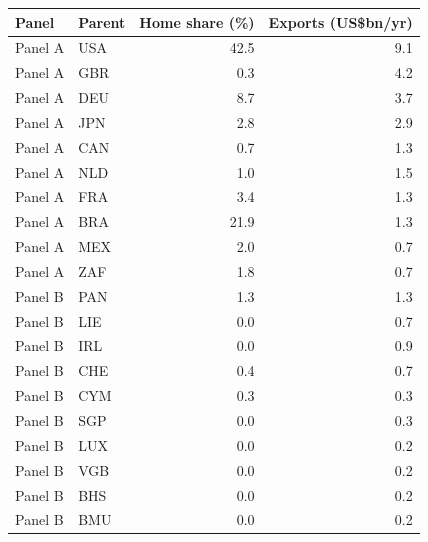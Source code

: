 \begin{tabular}{llrr}
\toprule
Panel & Parent & Home share (\%) & Exports (US\$bn/yr) \\
\midrule
Panel A & USA & 42.5 & 9.1 \\
Panel A & GBR & 0.3 & 4.2 \\
Panel A & DEU & 8.7 & 3.7 \\
Panel A & JPN & 2.8 & 2.9 \\
Panel A & CAN & 0.7 & 1.3 \\
Panel A & NLD & 1.0 & 1.5 \\
Panel A & FRA & 3.4 & 1.3 \\
Panel A & BRA & 21.9 & 1.3 \\
Panel A & MEX & 2.0 & 0.7 \\
Panel A & ZAF & 1.8 & 0.7 \\
\midrule
Panel B & PAN & 1.3 & 1.3 \\
Panel B & LIE & 0.0 & 0.7 \\
Panel B & IRL & 0.0 & 0.9 \\
Panel B & CHE & 0.4 & 0.7 \\
Panel B & CYM & 0.3 & 0.3 \\
Panel B & SGP & 0.0 & 0.3 \\
Panel B & LUX & 0.0 & 0.2 \\
Panel B & VGB & 0.0 & 0.2 \\
Panel B & BHS & 0.0 & 0.2 \\
Panel B & BMU & 0.0 & 0.2 \\
\bottomrule
\end{tabular}
